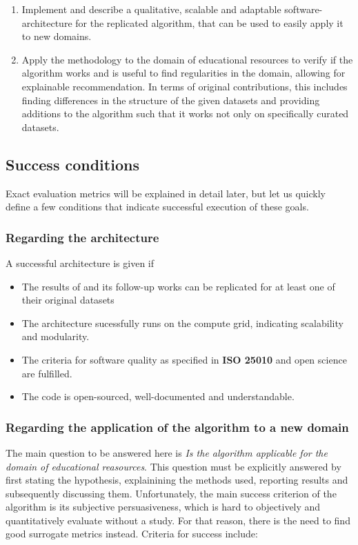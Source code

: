 \begin{enumerate}
	\item Implement and describe a qualitative, scalable and adaptable software-architecture for the replicated algorithm, that can be used to easily apply it to new domains.
	\item Apply the methodology to the domain of educational resources to verify if the algorithm works and is useful to find regularities in the domain, allowing for explainable recommendation. In terms of original contributions, this includes finding differences in the structure of the given datasets and providing additions to the algorithm such that it works not only on specifically curated datasets.
\end{enumerate}

\subsection{Success conditions}

Exact evaluation metrics will be explained in detail later, but let us quickly define a few conditions that indicate successful execution of these goals.

\subsubsection*{Regarding the architecture}

A successful architecture is given if 

\begin{itemize}
	\item The results of \cite{Derrac2015} and its follow-up works \cite{Ager2018,Alshaikh2020} can be replicated for at least one of their original datasets
	\item The architecture sucessfully runs on the compute grid, indicating scalability and modularity.
	\item The criteria for software quality as specified in \textbf{ISO 25010} and open science are fulfilled.
	\item The code is open-sourced, well-documented and understandable.
\end{itemize}

\subsubsection*{Regarding the application of the algorithm to a new domain}

The main question to be answered here is \textit{Is the algorithm applicable for the domain of educational reasources}. This question must be explicitly answered by first stating the hypothesis, explainining the methods used, reporting results and subsequently discussing them. Unfortunately, the main success criterion of the algorithm is its subjective persuasiveness, which is hard to objectively and quantitatively evaluate without a study. For that reason, there is the need to find good surrogate metrics instead. Criteria for success include:

